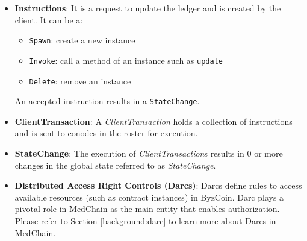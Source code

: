\begin{itemize}
    \item{\textbf{Instructions}}: It is a request to update the ledger and is created by the client. It can be a:
    \begin{itemize}
        \item \texttt{Spawn}: create a new instance
        \item \texttt{Invoke}: call a method of an instance such as \texttt{update}
        \item \texttt{Delete}: remove an instance
    \end{itemize}
    An accepted instruction results in a \texttt{StateChange}. 
    
    \item{\textbf{ClientTransaction}}: A \textit{ClientTransaction} holds a collection of instructions and is sent to conodes in the roster for execution.
    
    \item{\textbf{StateChange}}: The execution of \textit{ClientTransaction}s results in 0 or more changes in the global state referred to as \textit{StateChange}. 
    
    \item{\textbf{Distributed Access Right Controls (Darcs)}}: Darcs define rules to access available resources (such as contract instances) in ByzCoin. Darc plays a pivotal role in MedChain as the main entity that enables authorization. Please refer to Section \ref{background:darc} to learn more about Darcs in MedChain. 

\end{itemize}


 




